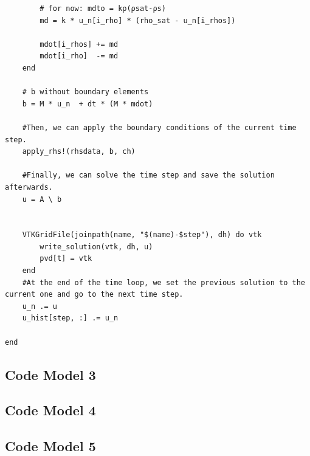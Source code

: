 \begin{appendices}
\begin{lstlisting}
        # for now: mdto = kρ(ρsat-ρs)
        md = k * u_n[i_rho] * (rho_sat - u_n[i_rhos])

        mdot[i_rhos] += md
        mdot[i_rho]  -= md
    end

    # b without boundary elements
    b = M * u_n  + dt * (M * mdot)

    #Then, we can apply the boundary conditions of the current time step.
    apply_rhs!(rhsdata, b, ch)

    #Finally, we can solve the time step and save the solution afterwards.
    u = A \ b

    
    VTKGridFile(joinpath(name, "$(name)-$step"), dh) do vtk
        write_solution(vtk, dh, u)
        pvd[t] = vtk
    end
    #At the end of the time loop, we set the previous solution to the current one and go to the next time step.
    u_n .= u
    u_hist[step, :] .= u_n

end    
\end{lstlisting}

\subsection{Code Model 3}

\subsection{Code Model 4}

\subsection{Code Model 5}

\end{appendices}